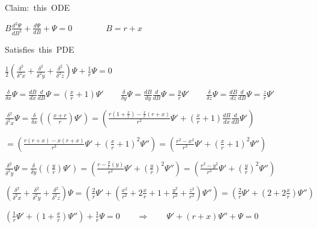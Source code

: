 \documentclass{beamer}
\begin{document}
\begin{frame}[fragile]
\scriptsize

\hbox{Claim: this ODE}\centerline{$B \frac{d^2\Psi}{dB^2} + \frac{d\Psi}{dB} + \Psi = 0 \qquad\qquad B = r + x$}
\vskip 20pt

\hbox{Satisfies this PDE}\centerline{$\frac{1}{2} \left(\frac{\delta^2}{\delta^2 x} + \frac{\delta^2}{\delta^2 y} + \frac{\delta^2}{\delta^2 z}\right) \Psi + \frac{1}{r}\Psi = 0$}

\vskip 20pt

\centerline{$\frac{\delta}{\delta x} \Psi = \frac{d B}{d x} \frac{d}{d B}  \Psi = \left(\frac{x}{r} + 1\right)\Psi' \qquad \frac{\delta}{\delta y} \Psi = \frac{d B}{d y} \frac{d}{d B}  \Psi = \frac{y}{r} \Psi' \qquad \frac{\delta}{\delta z} \Psi = \frac{d B}{d z} \frac{d}{d B}  \Psi = \frac{z}{r} \Psi' $}

\vskip 20pt

\centerline{$\frac{\delta^2}{\delta^2 x} \Psi = \frac{\delta}{\delta x} \left(\left(\frac{x + r}{r}\right) \Psi'\right) = \left(\frac{r(1 + \frac{x}{r}) - \frac{x}{r}(r+x)}{r^2} \Psi' + \left(\frac{x}{r} + 1\right)\frac{dB}{dx}\frac{d}{dB}\Psi'\right)$}
\centerline{$= \left(\frac{r(r + x) - x(r+x)}{r^3} \Psi' + \left(\frac{x}{r} + 1\right)^2\Psi''\right) = \left(\frac{r^2 - x^2}{r^3} \Psi' + \left(\frac{x}{r} + 1\right)^2\Psi''\right)$}

\vskip 20pt

\centerline{$\frac{\delta^2}{\delta^2 y} \Psi = \frac{\delta}{\delta y} \left(\left(\frac{y}{r}\right) \Psi'\right) = \left(\frac{r - \frac{y}{r}(y)}{r^2} \Psi' + \left(\frac{y}{r}\right)^2\Psi''\right) = \left(\frac{r^2 - y^2}{r^3} \Psi' + \left(\frac{y}{r}\right)^2\Psi''\right)$}

\vskip 20pt

\centerline{$\left(\frac{\delta^2}{\delta^2 x} + \frac{\delta^2}{\delta^2 y} + \frac{\delta^2}{\delta^2 z}\right) \Psi = \left(\frac{2}{r}\Psi' + \left(\frac{x^2}{r^2} + 2\frac{x}{r} + 1 + \frac{y^2}{r^2} + \frac{z^2}{r^2}\right)\Psi''\right)  = \left(\frac{2}{r}\Psi' + \left(2 + 2\frac{x}{r}\right)\Psi''\right)$}

\vskip 20pt
\centerline{$\left(\frac{1}{r}\Psi' + \left(1 + \frac{x}{r}\right)\Psi''\right) + \frac{1}{r}\Psi = 0 \qquad\Rightarrow\qquad \Psi' + \left(r + x\right)\Psi'' + \Psi = 0$}

\end{frame}
\end{document}
